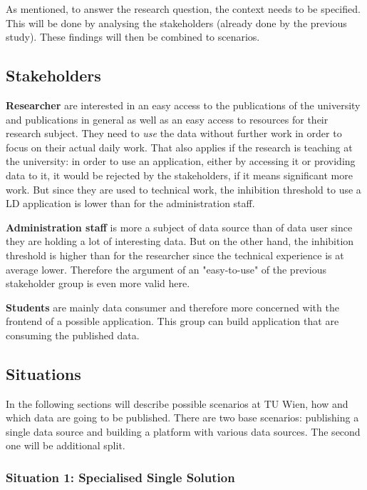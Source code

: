As mentioned, to answer the research question, the context needs to be specified. This will be done by analysing the stakeholders (already done by the previous study). These findings will then be combined to scenarios.

\subsection{Stakeholders}

\textbf{Researcher} are interested in an easy access to the publications of the university and publications in general as well as an easy access to resources for their research subject. They need to \emph{use} the data without further work in order to focus on their actual daily work. That also applies if the research is teaching at the university: in order to use an application, either by accessing it or providing data to it, it would be rejected by the stakeholders, if it means significant more work. But since they are used to technical work, the inhibition threshold to use a LD application is lower than for the administration staff.

\textbf{Administration staff} is more a subject of data source than of data user since they are holding a lot of interesting data. But on the other hand, the 
inhibition threshold is higher than for the researcher since the technical experience is at average lower. Therefore the argument of an "easy-to-use" of the previous stakeholder group is even more valid here.

\textbf{Students} are mainly data consumer and therefore more concerned with the frontend of a possible application. This group can build application that are consuming the published data.

\subsection{Situations}

In the following sections will describe possible scenarios at TU Wien, how and which data are going to be published. There are two base scenarios: publishing a single data source and building a platform with various data sources. The second one will be additional split.

\subsubsection{Situation 1: Specialised Single Solution}

